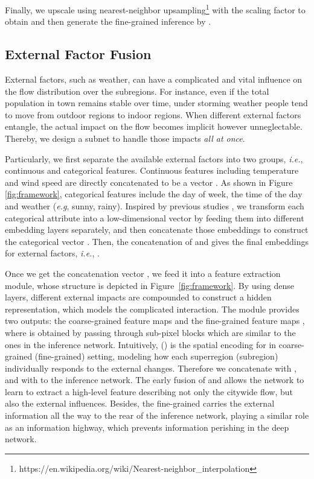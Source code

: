 Finally, we upscale  using nearest-neighbor upsampling\footnote{https://en.wikipedia.org/wiki/Nearest-neighbor\_interpolation} with the scaling factor  to obtain  and then generate the fine-grained inference by .

\subsection{External Factor Fusion}
External factors, such as weather, can have a complicated and vital influence on the flow distribution over the subregions. For instance, even if the total population in town remains stable over time, under storming weather people tend to move from outdoor regions to indoor regions. When different external factors entangle, the actual impact on the flow becomes implicit however unneglectable. Thereby, we design a subnet to handle those impacts \textit{all at once}.

Particularly, we first separate the available external factors into two groups, \emph{i.e.}, continuous and categorical features. Continuous features including temperature and wind speed are directly concatenated to be a vector . As shown in Figure \ref{fig:framework}, categorical features include the day of week, the time of the day and weather (\emph{e.g}, sunny, rainy). Inspired by previous studies \cite{liang2018geoman}, we transform each categorical attribute into a low-dimensional vector by feeding them into different embedding layers separately, and then concatenate those embeddings to construct the categorical vector . Then, the concatenation of  and  gives the final embeddings for external factors, \emph{i.e.}, .

Once we get the concatenation vector , we feed it into a feature extraction module, whose structure is depicted in Figure~\ref{fig:framework}. By using dense layers, different external impacts are compounded to construct a hidden representation, which models the complicated interaction. The module provides two outputs: the coarse-grained feature maps  and the fine-grained feature maps , where  is obtained by passing  through  sub-pixel blocks which are similar to the ones in the inference network. Intuitively,  () is the spatial encoding for  in coarse-grained (fine-grained) setting, modeling how each superregion (subregion) individually responds to the external changes. Therefore we concatenate  with , and  with  to the inference network. The early fusion of  and  allows the network to learn to extract a high-level feature describing not only the citywide flow, but also the external influences. Besides, the fine-grained  carries the external information all the way to the rear of the inference network, playing a similar role as an information highway, which prevents information perishing in the deep network.

